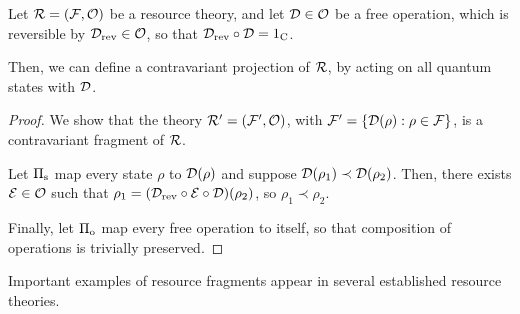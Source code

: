 \documentclass[pra,
aps,
twocolumn,
superscriptaddress,
groupedaddress,
nofootinbib,
reprint
]{revtex4-1}
\begin{document}
\begin{proposition}
	Let $\mathcal{R} = (\mathcal{F},\mathcal{O})$ be a resource theory, and let $\mathcal{D} \in \mathcal{O}$ be a free operation, which is reversible by $\mathcal{D}_{\rm{rev}} \in \mathcal{O}$, so that $\mathcal{D}_{\rm{rev}} \circ \mathcal{D} = 1_{\rm{C}}$.
	
	Then, we can define a contravariant projection of $\mathcal{R}$, by acting on all quantum states with $\mathcal{D}$.
\end{proposition}
\begin{proof}
	We show that the theory $\mathcal{R}' = (\mathcal{F}', \mathcal{O})$, with $\mathcal{F}' = \{\mathcal{D}(\rho):\rho \in \mathcal{F} \}$, is a contravariant fragment of $\mathcal{R}$.
	
	Let $\Pi_{\rm{s}}$ map every state $\rho$ to $\mathcal{D}(\rho)$ and suppose $\mathcal{D}(\rho_1) \prec \mathcal{D}(\rho_2)$. 
	Then, there exists $\mathcal{E} \in \mathcal{O}$ such that $\rho_1 = (\mathcal{D}_{\rm{rev}} \circ \mathcal{E} \circ \mathcal{D}) (\rho_2)$, so $\rho_1 \prec \rho_2$.
	
	Finally, let $\Pi_{\rm{o}}$ map every free operation to itself, so that composition of operations is trivially preserved.
	
\end{proof}

Important examples of resource fragments appear in several established resource theories. 
\end{document}
